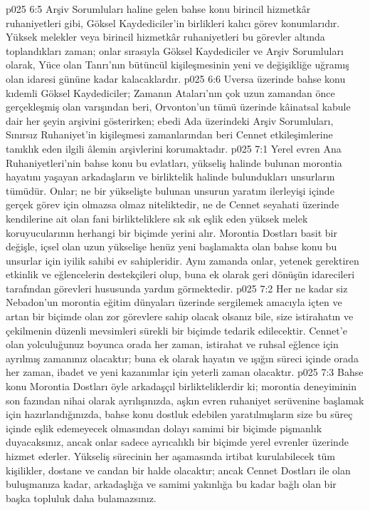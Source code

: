 \vs p025 6:5 Arşiv Sorumluları haline gelen bahse konu birincil hizmetkâr ruhaniyetleri gibi, Göksel Kaydediciler’in birlikleri kalıcı görev konumlarıdır. Yüksek melekler veya birincil hizmetkâr ruhaniyetleri bu görevler altında toplandıkları zaman; onlar sırasıyla Göksel Kaydediciler ve Arşiv Sorumluları olarak, Yüce olan Tanrı’nın bütüncül kişileşmesinin yeni ve değişikliğe uğramış olan idaresi gününe kadar kalacaklardır.
\vs p025 6:6 Uversa üzerinde bahse konu kıdemli Göksel Kaydediciler; Zamanın Ataları’nın çok uzun zamandan önce gerçekleşmiş olan varışından beri, Orvonton’un tümü üzerinde kâinatsal kabule dair her şeyin arşivini gösterirken; ebedi Ada üzerindeki Arşiv Sorumluları, Sınırsız Ruhaniyet’in kişileşmesi zamanlarından beri Cennet etkileşimlerine tanıklık eden ilgili âlemin arşivlerini korumaktadır.
\vs p025 7:1 Yerel evren Ana Ruhaniyetleri’nin bahse konu bu evlatları, yükseliş halinde bulunan morontia hayatını yaşayan arkadaşların ve birliktelik halinde bulundukları unsurların tümüdür. Onlar; ne bir yükselişte bulunan unsurun yaratım ilerleyişi içinde gerçek görev için olmazsa olmaz niteliktedir, ne de Cennet seyahati üzerinde kendilerine ait olan fani birlikteliklere sık sık eşlik eden yüksek melek koruyucularının herhangi bir biçimde yerini alır. Morontia Dostları basit bir değişle, içsel olan uzun yükselişe henüz yeni başlamakta olan bahse konu bu unsurlar için iyilik sahibi ev sahipleridir. Aynı zamanda onlar, yetenek gerektiren etkinlik ve eğlencelerin destekçileri olup, buna ek olarak geri dönüşün idarecileri tarafından görevleri hususunda yardım görmektedir.
\vs p025 7:2 Her ne kadar siz Nebadon’un morontia eğitim dünyaları üzerinde sergilemek amacıyla içten ve artan bir biçimde olan zor görevlere sahip olacak olsanız bile, size istirahatın ve çekilmenin düzenli mevsimleri sürekli bir biçimde tedarik edilecektir. Cennet’e olan yolculuğunuz boyunca orada her zaman, istirahat ve ruhsal eğlence için ayrılmış zamanınız olacaktır; buna ek olarak hayatın ve ışığın süreci içinde orada her zaman, ibadet ve yeni kazanımlar için yeterli zaman olacaktır.
\vs p025 7:3 Bahse konu Morontia Dostları öyle arkadaşçıl birlikteliklerdir ki; morontia deneyiminin son fazından nihai olarak ayrılışınızda, aşkın evren ruhaniyet serüvenine başlamak için hazırlandığınızda, bahse konu dostluk edebilen yaratılmışların size bu süreç içinde eşlik edemeyecek olmasından dolayı samimi bir biçimde pişmanlık duyacaksınız, ancak onlar sadece ayrıcalıklı bir biçimde yerel evrenler üzerinde hizmet ederler. Yükseliş sürecinin her aşamasında irtibat kurulabilecek tüm kişilikler, dostane ve candan bir halde olacaktır; ancak Cennet Dostları ile olan buluşmanıza kadar, arkadaşlığa ve samimi yakınlığa bu kadar bağlı olan bir başka topluluk daha bulamazsınız.
